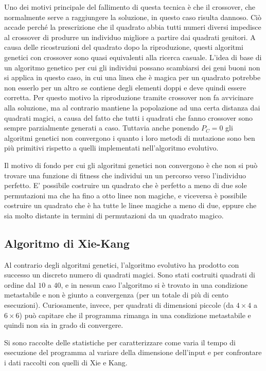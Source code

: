 \documentclass[italian,twoside,twocolumn]{article}
\begin{document}
Uno dei motivi principale del fallimento di questa tecnica è che il crossover, che normalmente serve a raggiungere la soluzione, in questo caso risulta dannoso. Ciò accade perché la prescrizione che il quadrato abbia tutti numeri diversi impedisce al crossover di produrre un individuo migliore a partire dai quadrati genitori. A causa delle ricostruzioni del quadrato dopo la riproduzione, questi algoritmi genetici con crossover sono quasi equivalenti alla ricerca casuale. L'idea di base di un algoritmo genetico per cui gli individui possano scambiarsi dei geni buoni non si applica in questo caso, in cui una linea che è magica per un quadrato potrebbe non esserlo per un altro se contiene degli elementi doppi e deve quindi essere corretta. Per questo motivo la riproduzione tramite crossover non fa avvicinare alla soluzione, ma al contrario mantiene la popolazione ad una certa distanza dai quadrati magici, a causa del fatto che tutti i quadrati che fanno crossover sono sempre 	parzialmente generati a caso. Tuttavia anche ponendo $ P_C = 0 $ gli algoritmi genetici non convergono i quanto i loro metodi di mutazione sono ben più primitivi rispetto a quelli implementati nell'algoritmo evolutivo. 

Il motivo di fondo per cui gli algoritmi genetici non convergono è che non si può trovare una funzione di fitness che individui un un percorso verso l'individuo perfetto. E' possibile costruire un quadrato che è perfetto a meno di due sole permutazioni ma che ha fino a otto linee non magiche, e viceversa è possibile costruire un quadrato che è ha tutte le linee magiche a meno di due, eppure che sia molto distante in termini di permutazioni da un quadrato magico.

\subsection{Algoritmo di Xie-Kang}
Al contrario degli algoritmi genetici, l'algoritmo evolutivo ha prodotto con successo un discreto numero di quadrati magici. Sono stati costruiti quadrati di ordine dal $ 10 $ a $ 40 $, e in nessun caso l'algoritmo si è trovato in una condizione metastabile e non è giunto a convergenza (per un totale di più di cento esecuzioni). Curiosamente, invece, per quadrati di dimensioni piccole (da $ 4\times 4 $ a $ 6\times6 $) può capitare che il programma rimanga in una condizione metastabile e quindi non sia in grado di convergere. 

Si sono raccolte delle statistiche per caratterizzare come varia il tempo di esecuzione del programma al variare della dimensione dell'input e per confrontare i dati raccolti con quelli di Xie e Kang. 
\end{document}
